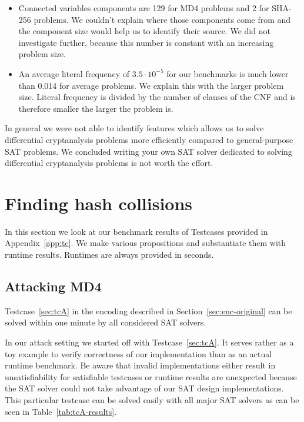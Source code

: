 \begin{itemize}
  \item Connected variables components are 129 for MD4 problems and 2 for SHA-256
    problems. We couldn't explain where those components come from and the
    component size would help us to identify their source. We did not investigate
    further, because this number is constant with an increasing problem size.

  \item An average literal frequency of $3.5\cdot 10^{-5}$ for our benchmarks
    is much lower than 0.014 for average problems. We explain this with the
    larger problem size. Literal frequency is divided by the number of clauses
    of the CNF and is therefore smaller the larger the problem is.
\end{itemize}

In general we were not able to identify features which allows us to solve
differential cryptanalysis problems more efficiently compared to
general-purpose SAT problems. We concluded writing your own SAT solver
dedicated to solving differential cryptanalysis problems is not worth
the effort.

\section{Finding hash collisions}
\label{sec:results-attacks}

In this section we look at our benchmark results of Testcases provided in
Appendix~\ref{app:tc}. We make various propositions and substantiate them
with runtime results. Runtimes are always provided in seconds.

\subsection{Attacking MD4}
\label{sec:results-md4}
%
\begin{prop}
  Testcase~\ref{sec:tcA} in the encoding described in Section~\ref{sec:enc-original}
  can be solved within one minute by all considered SAT solvers.
\end{prop}

In our attack setting we started off with Testcase~\ref{sec:tcA}. It serves
rather as a toy example to verify correctness of our implementation than
as an actual runtime benchmark. Be aware that invalid implementations either
result in unsatisfiability for satisfiable testcases or runtime results are
unexpected because the SAT solver could not take advantage of our SAT design
implementations. This particular testcase can be solved easily with all major
SAT solvers as can be seen in Table~\ref{tab:tcA-results}.

